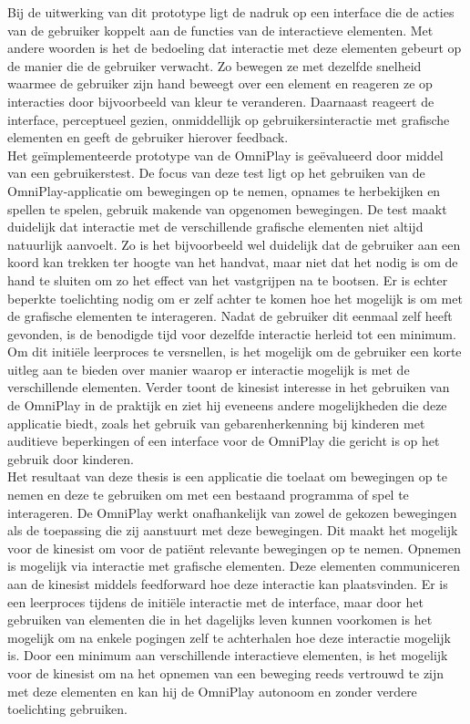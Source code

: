 Bij de uitwerking van dit prototype ligt de nadruk op een interface die de acties van de gebruiker koppelt aan de functies van de interactieve elementen. Met andere woorden is het de bedoeling dat interactie met deze elementen gebeurt op de manier die de gebruiker verwacht. Zo bewegen ze met dezelfde snelheid waarmee de gebruiker zijn hand beweegt over een element en reageren ze op interacties door bijvoorbeeld van kleur te veranderen. Daarnaast reageert de interface, perceptueel gezien, onmiddellijk op gebruikersinteractie met grafische elementen en geeft de gebruiker hierover feedback.\\

Het ge\"implementeerde prototype van de OmniPlay is ge\"evalueerd door middel van een gebruikerstest. De focus van deze test ligt op het gebruiken van de OmniPlay-applicatie om bewegingen op te nemen, opnames te herbekijken en spellen te spelen, gebruik makende van opgenomen bewegingen. De test maakt duidelijk dat interactie met de verschillende grafische elementen niet altijd natuurlijk aanvoelt. Zo is het bijvoorbeeld wel duidelijk dat de gebruiker aan een koord kan trekken ter hoogte van het handvat, maar niet dat het nodig is om de hand te sluiten om zo het effect van het vastgrijpen na te bootsen. Er is echter beperkte toelichting nodig om er zelf achter te komen hoe het mogelijk is om met de grafische elementen te interageren. Nadat de gebruiker dit eenmaal zelf heeft gevonden, is de benodigde tijd voor dezelfde interactie herleid tot een minimum. Om dit initi\"ele leerproces te versnellen, is het mogelijk om de gebruiker een korte uitleg aan te bieden over manier waarop er interactie mogelijk is met de verschillende elementen. Verder toont de kinesist interesse in het gebruiken van de OmniPlay in de praktijk en ziet hij eveneens andere mogelijkheden die deze applicatie biedt, zoals het gebruik van gebarenherkenning bij kinderen met auditieve beperkingen of een interface voor de OmniPlay die gericht is op het gebruik door kinderen.\\

Het resultaat van deze thesis is een applicatie die toelaat om bewegingen op te nemen en deze te gebruiken om met een bestaand programma of spel te interageren. De OmniPlay werkt onafhankelijk van zowel de gekozen bewegingen als de toepassing die zij aanstuurt met deze bewegingen. Dit maakt het mogelijk voor de kinesist om voor de pati\"ent relevante bewegingen op te nemen. Opnemen is mogelijk via interactie met grafische elementen. Deze elementen communiceren aan de kinesist middels feedforward hoe deze interactie kan plaatsvinden. Er is een leerproces tijdens de initi\"ele interactie met de interface, maar door het gebruiken van elementen die in het dagelijks leven kunnen voorkomen is het mogelijk om na enkele pogingen zelf te achterhalen hoe deze interactie mogelijk is. Door een minimum aan verschillende interactieve elementen, is het mogelijk voor de kinesist om na het opnemen van een beweging reeds vertrouwd te zijn met deze elementen en kan hij de OmniPlay autonoom en zonder verdere toelichting gebruiken.
